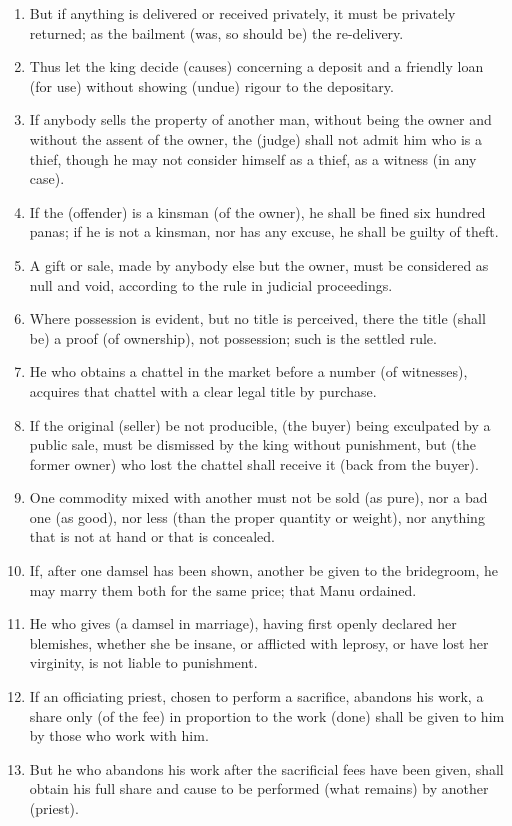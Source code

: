 \begin{enumerate}
\item But if anything is delivered or received privately, it must be privately returned; as the bailment (was, so should be) the re-delivery.
\item Thus let the king decide (causes) concerning a deposit and a friendly loan (for use) without showing (undue) rigour to the depositary.
\item If anybody sells the property of another man, without being the owner and without the assent of the owner, the (judge) shall not admit him who is a thief, though he may not consider himself as a thief, as a witness (in any case).
\item If the (offender) is a kinsman (of the owner), he shall be fined six hundred panas; if he is not a kinsman, nor has any excuse, he shall be guilty of theft.
\item A gift or sale, made by anybody else but the owner, must be considered as null and void, according to the rule in judicial proceedings.
\item Where possession is evident, but no title is perceived, there the title (shall be) a proof (of ownership), not possession; such is the settled rule.
\item He who obtains a chattel in the market before a number (of witnesses), acquires that chattel with a clear legal title by purchase.
\item If the original (seller) be not producible, (the buyer) being exculpated by a public sale, must be dismissed by the king without punishment, but (the former owner) who lost the chattel shall receive it (back from the buyer).
\item One commodity mixed with another must not be sold (as pure), nor a bad one (as good), nor less (than the proper quantity or weight), nor anything that is not at hand or that is concealed.
\item If, after one damsel has been shown, another be given to the bridegroom, he may marry them both for the same price; that Manu ordained.
\item He who gives (a damsel in marriage), having first openly declared her blemishes, whether she be insane, or afflicted with leprosy, or have lost her virginity, is not liable to punishment.
\item If an officiating priest, chosen to perform a sacrifice, abandons his work, a share only (of the fee) in proportion to the work (done) shall be given to him by those who work with him.
\item But he who abandons his work after the sacrificial fees have been given, shall obtain his full share and cause to be performed (what remains) by another (priest).

\end{enumerate}
